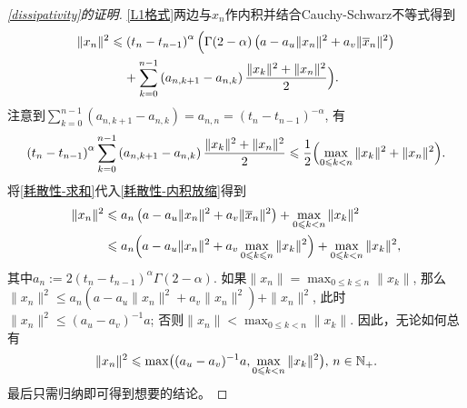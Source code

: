 \begin{proof}[\cref{dissipativity}的证明]
    \cref{L1格式}两边与$x_n$作内积并结合Cauchy-Schwarz不等式得到
    \begin{equation}\label{耗散性-内积放缩}
        \begin{aligned}
            \|x_n\|^2&\leqslant \left(t_n-t_{n-1}\right)^\alpha \Bigl( \Gamma(2-\alpha) \left(a-a_u \|x_n\|^2 + a_v \|\overline x_n\|^2\right)
            \\ &\relphantom{\leqslant} + \sum_{k=0}^{n-1} \left(a_{n,k+1}-a_{n,k}\right) \frac{\|x_k\|^2+\|x_n\|^2}{2}\Bigr).
        \end{aligned}
    \end{equation}
    注意到$\sum_{k=0}^{n-1} \left(a_{n,k+1}-a_{n,k}\right)=a_{n,n}=\left(t_n-t_{n-1}\right)^{-\alpha}$, 有
    \begin{equation}\label{耗散性-求和}
        \left(t_n-t_{n-1}\right)^\alpha \sum_{k=0}^{n-1} \left(a_{n,k+1}-a_{n,k}\right) \frac{\|x_k\|^2+\|x_n\|^2}{2}\leqslant\frac{1}{2}\Bigl(\max_{0\leqslant k<n} \|x_k\|^2 + \|x_n\|^2\Bigr).
    \end{equation}
    将\eqref{耗散性-求和}代入\cref{耗散性-内积放缩}得到
    \begin{align*}
        \|x_n\|^2 &\leqslant a_n \left(a-a_u \|x_n\|^2 + a_v \|\overline x_n\|^2\right) + \max_{0\leqslant k<n} \|x_k\|^2
        \\ &\leqslant a_n \Bigl(a-a_u \|x_n\|^2 + a_v \max_{0\leqslant k\leqslant n} \|x_k\|^2\Bigr) + \max_{0\leqslant k<n} \|x_k\|^2,
    \end{align*}
    其中$a_n:=2\left(t_n-t_{n-1}\right)^\alpha \Gamma(2-\alpha)$. 如果$\|x_n\|=\max_{0\leqslant k\leqslant n}\|x_k\|$, 那么$\|x_n\|^2 \leqslant a_n \left(a-a_u \|x_n\|^2 + a_v \|x_n\|^2\right) + \|x_n\|^2$, 此时$\|x_n\|^2 \leqslant (a_u-a_v)^{-1}a$; 否则$\|x_n\|<\max_{0\leqslant k<n}\|x_k\|$.
    因此，无论如何总有
    \begin{equation*}
        \|x_n\|^2\leqslant \max\bigl((a_u-a_v)^{-1}a,\max_{0\leqslant k<n}\|x_k\|^2\bigr),\,n\in\mathbb{N_+}.
    \end{equation*}
    最后只需归纳即可得到想要的结论。
\end{proof}

